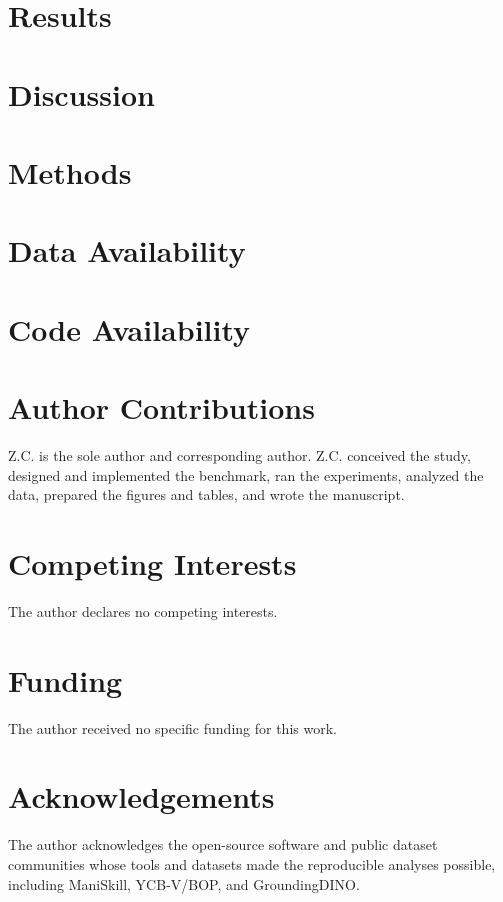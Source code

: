 \documentclass[10pt]{article}
\begin{document}
\section{Results}


\section{Discussion}


\section{Methods}


\section{Data Availability}


\section{Code Availability}


\section{Author Contributions}
Z.C. is the sole author and corresponding author. Z.C. conceived the study, designed and implemented the benchmark, ran the experiments, analyzed the data, prepared the figures and tables, and wrote the manuscript.

\section{Competing Interests}
The author declares no competing interests.

\section{Funding}
The author received no specific funding for this work.

\section{Acknowledgements}
The author acknowledges the open-source software and public dataset communities whose tools and datasets made the reproducible analyses possible, including ManiSkill, YCB-V/BOP, and GroundingDINO.



\end{document}
